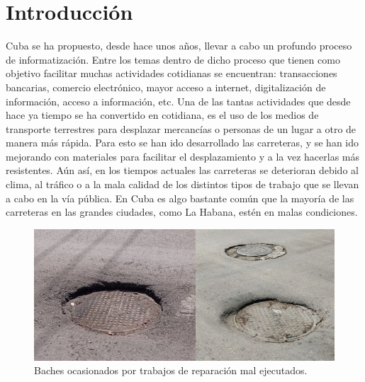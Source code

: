 \chapter*{Introducción}\label{chapter:introduction}

Cuba se ha propuesto, desde hace unos años, llevar a cabo un profundo proceso de informatización.
Entre los temas dentro de dicho proceso que tienen como objetivo facilitar muchas actividades
cotidianas se encuentran: transacciones bancarias, comercio electrónico, mayor acceso a internet, digitalización
de información, acceso a información, etc. Una de las tantas actividades que desde hace ya tiempo se ha convertido en
cotidiana, es el uso de los medios de transporte terrestres para desplazar mercancías o personas de un lugar a otro de
manera más rápida. Para esto se han ido desarrollado las carreteras, y se han ido mejorando con materiales para facilitar
el desplazamiento y a la vez hacerlas más resistentes. Aún así, en los tiempos actuales las carreteras se deterioran
debido al clima, al tráfico o a la mala calidad de los distintos tipos de trabajo que se llevan a cabo en la vía
pública. En Cuba es algo bastante común que la mayoría de las carreteras en las grandes ciudades, como La Habana,
estén en malas condiciones.\\

\begin{figure}[htb]
	\centering
	\includegraphics[scale=0.45]{Graphics/pothole_due_to_bad_job_1}
	\caption{Baches ocasionados por trabajos de reparación mal ejecutados.}
	\label{fig:1}
\end{figure}
	
